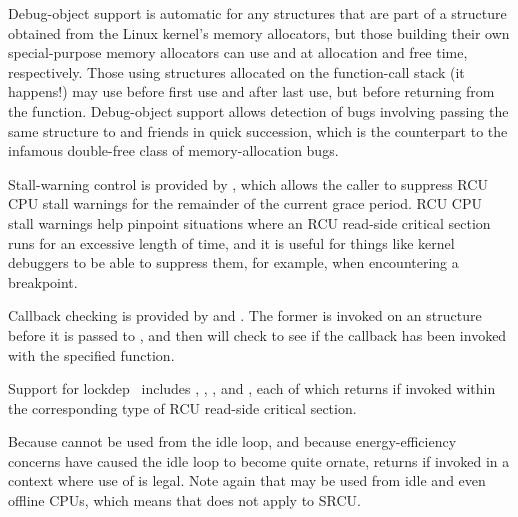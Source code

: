 Debug-object support is automatic for any  structures
that are part of a structure obtained from the Linux kernel's
memory allocators, but those building their own special-purpose
memory allocators can use  and 
at allocation and free time, respectively.
Those using  structures allocated on the function-call
stack (it happens!\@) may use 
before first use and  after last use,
but before returning from the function.
Debug-object support allows detection of bugs involving passing the
same  structure to  and friends in
quick succession, which is the  counterpart to the
infamous double-free class of memory-allocation bugs.

Stall-warning control is provided by , which
allows the caller to suppress RCU CPU stall warnings for the remainder
of the current grace period.
RCU CPU stall warnings help pinpoint situations where an RCU read-side
critical section runs for an excessive length of time, and it is useful
for things like kernel debuggers to be able to suppress them, for example,
when encountering a breakpoint.

Callback checking is provided by  and
.
The former is invoked on an  structure before it is passed
to , and then  will
check to see if the callback has been invoked with the specified
function.

Support for lockdep~\cite{JonathanCorbet2006lockdep} includes
,
,
, and
,
each of which returns  if invoked within the corresponding
type of RCU read-side critical section.

\QuickQuizEnd

Because  cannot be used from the idle loop,
and because energy-efficiency concerns have caused the idle loop
to become quite ornate,  returns  if
invoked in a context where use of  is legal.
Note again that  may be used from idle and
even offline CPUs, which means that  does not
apply to SRCU\@.

